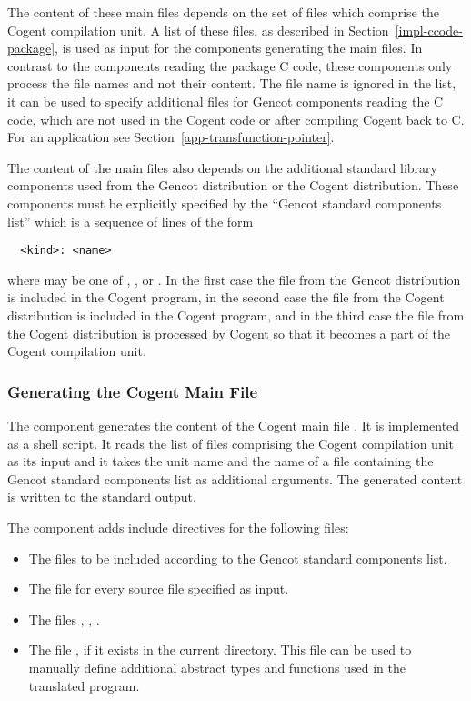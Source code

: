The content of these main files depends on the set of  files which comprise the Cogent compilation unit.
A list of these files, as described in Section~\ref{impl-ccode-package}, is used as input for the components generating
the main files. In contrast to the components reading the package C code, these components only process the file 
names and not their content. The file name  is ignored in the list, it can be used
to specify additional  files for Gencot components reading the C code, which are not used in the Cogent 
code or after compiling Cogent back to C. For an application see Section~\ref{app-transfunction-pointer}.

The content of the main files also depends on the additional standard library components used from the Gencot distribution
or the Cogent distribution. These components must be explicitly specified by the ``Gencot standard components list'' which
is a sequence of lines of the form
\begin{verbatim}
  <kind>: <name>
\end{verbatim}
where  may be one of , , or . In the first case the file
 from the Gencot distribution is included in the Cogent program, in the 
second case the file  from the Cogent distribution is included in the 
Cogent program, and in the third case the file  from the Cogent distribution 
is processed by Cogent so that it becomes a part of the Cogent compilation unit.

\subsubsection{Generating the Cogent Main File}

The component  generates the content of the Cogent main file . 
It is implemented as a shell script. It reads the list of
 files comprising the Cogent compilation unit as its input and it takes the unit name 
and the name of a file containing the Gencot standard components list as additional arguments. The generated content 
is written to the standard output. 

The component adds include directives for the following files:
\begin{itemize}
\item The files to be included according to the Gencot standard components list.
\item The file  for every source file  specified as input.
\item The files , , .
\item The file , if it exists in the current directory. This file can be used to
manually define additional abstract types and functions used in the translated program.
\end{itemize}

